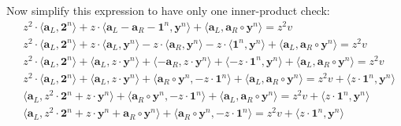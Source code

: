 \documentclass[../lecture-notes-148x210.tex]{subfiles}
\begin{document}
Now simplify this expression to have only one inner-product check:
\begin{equation*}
    \begin{aligned}
        & z^2 \cdot \langle \mathbf{a}_L, \mathbf{2}^n \rangle + z \cdot \langle \mathbf{a}_L - \mathbf{a}_R - \mathbf{1}^n, \mathbf{y}^n \rangle + \langle \mathbf{a}_L, \mathbf{a}_R \circ \mathbf{y}^n \rangle = z^2v \\
        & z^2 \cdot \langle \mathbf{a}_L, \mathbf{2}^n \rangle + \boxed{z \cdot \langle \mathbf{a}_L, \mathbf{y}^n \rangle - z \cdot \langle \mathbf{a}_R, \mathbf{y}^n \rangle - z \cdot \langle \mathbf{1}^n, \mathbf{y}^n \rangle} + \langle \mathbf{a}_L, \mathbf{a}_R \circ \mathbf{y}^n \rangle = z^2v \\
        & z^2 \cdot \langle \mathbf{a}_L, \mathbf{2}^n \rangle + \boxed{\langle \mathbf{a}_L, z \cdot \mathbf{y}^n \rangle + \langle - \mathbf{a}_R, z \cdot \mathbf{y}^n \rangle + \langle - z \cdot \mathbf{1}^n, \mathbf{y}^n \rangle} + \langle \mathbf{a}_L, \mathbf{a}_R \circ \mathbf{y}^n \rangle = z^2v \\
        & z^2 \cdot \langle \mathbf{a}_L, \mathbf{2}^n \rangle + \langle \mathbf{a}_L, z \cdot \mathbf{y}^n \rangle + \boxed{\langle \mathbf{a}_R \circ \mathbf{y}^n, - z \cdot \mathbf{1}^n \rangle} + \langle \mathbf{a}_L, \mathbf{a}_R \circ \mathbf{y}^n \rangle = z^2v + \boxed{\langle z \cdot \mathbf{1}^n, \mathbf{y}^n \rangle} \\
        & \boxed{\langle \mathbf{a}_L, z^2 \cdot \mathbf{2}^n + z \cdot \mathbf{y}^n \rangle}  + \langle \mathbf{a}_R \circ \mathbf{y}^n, - z \cdot \mathbf{1}^n \rangle + \boxed{\langle\mathbf{a}_L, \mathbf{a}_R \circ \mathbf{y}^n \rangle} = z^2v + \langle z \cdot \mathbf{1}^n, \mathbf{y}^n \rangle \\
        & \boxed{\langle \mathbf{a}_L, z^2 \cdot \mathbf{2}^n + z \cdot \mathbf{y}^n + \mathbf{a}_R \circ \mathbf{y}^n\rangle}  + \langle \mathbf{a}_R \circ \mathbf{y}^n, - z \cdot \mathbf{1}^n \rangle = z^2v + \langle z \cdot \mathbf{1}^n, \mathbf{y}^n \rangle \\
    \end{aligned}
\end{equation*}
\end{document}
